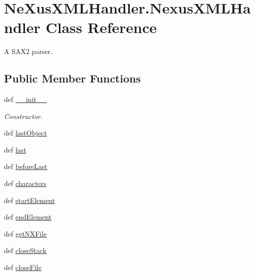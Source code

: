 \hypertarget{classNeXusXMLHandler_1_1NexusXMLHandler}{
\section{NeXusXMLHandler.NexusXMLHandler Class Reference}
\label{classNeXusXMLHandler_1_1NexusXMLHandler}
}


A SAX2 parser.  
\subsection*{Public Member Functions}
\begin{DoxyCompactItemize}
\item 
def \hyperlink{classNeXusXMLHandler_1_1NexusXMLHandler_a932ed87e64e19d770ad409c5bb8c9a55}{\_\-\_\-init\_\-\_\-}
\begin{DoxyCompactList}\small\item\em Constructor. \item\end{DoxyCompactList}\item 
def \hyperlink{classNeXusXMLHandler_1_1NexusXMLHandler_a93964a4084ced8a69557dd2f08db8a37}{lastObject}
\item 
def \hyperlink{classNeXusXMLHandler_1_1NexusXMLHandler_a687710f09884c337240c215e38954abb}{last}
\item 
def \hyperlink{classNeXusXMLHandler_1_1NexusXMLHandler_a6a6ef821d7ec895546fdf3d4385e675a}{beforeLast}
\item 
def \hyperlink{classNeXusXMLHandler_1_1NexusXMLHandler_a511fcde10a9b9d8c2e15ee7db985afd0}{characters}
\item 
def \hyperlink{classNeXusXMLHandler_1_1NexusXMLHandler_a8259fda2b54bbec9c7b769ce747dd71e}{startElement}
\item 
def \hyperlink{classNeXusXMLHandler_1_1NexusXMLHandler_a7eaf181e6f44254524d5af581f7bca04}{endElement}
\item 
def \hyperlink{classNeXusXMLHandler_1_1NexusXMLHandler_aae79ec1d3f132674e5461f65ac2ac544}{getNXFile}
\item 
def \hyperlink{classNeXusXMLHandler_1_1NexusXMLHandler_af18a74c3a7cd434a8c36030b9f57aafe}{closeStack}
\item 
def \hyperlink{classNeXusXMLHandler_1_1NexusXMLHandler_a2ace80a98195619c99f25b1fde5f0bdc}{closeFile}
\end{DoxyCompactItemize}
